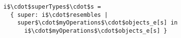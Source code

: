 \lstset{frame=tb, aboveskip=12pt, belowskip=-3pt, breaklines=true, basicstyle=\small\ttfamily, tabsize=2, mathescape=true}
\begin{lstlisting}[caption={facts.als, lines 158-161}, label=alloy:INTERFACE_SUBTYPE, captionpos=b]
i$\cdot$superTypes$\cdot$s =
  { super: i$\cdot$resembles |
    super$\cdot$myOperations$\cdot$objects_e[s] in
      i$\cdot$myOperations$\cdot$objects_e[s] }
\end{lstlisting}